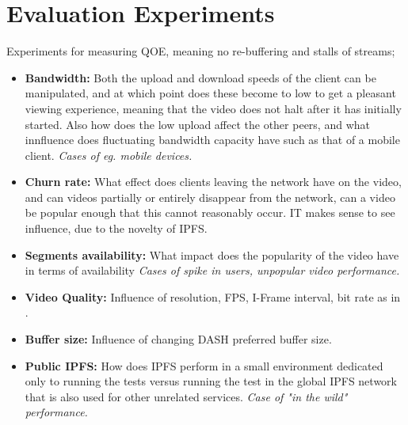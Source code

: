 \section{Evaluation Experiments}
Experiments for measuring \ac{QOE}, meaning no re-buffering and stalls of streams;
\begin{itemize}
    \item \textbf{Bandwidth:}
    Both the upload and download speeds of the client can be manipulated, and at which point does these become to low to get a pleasant viewing experience, meaning that the video does not halt after it has initially started. Also how does the low upload affect the other peers, and what innfluence does fluctuating bandwidth capacity have such as that of a mobile client.
    \textit{Cases of eg. mobile devices.}
    \item \textbf{Churn rate:}
    What effect does clients leaving the network have on the video, and can videos partially or entirely disappear from the network, can a video be popular enough that this cannot reasonably occur. IT makes sense to see influence, due to the novelty of IPFS.
    \item \textbf{Segments availability:}
    What impact does the popularity of the video have in terms of availability
    \textit{Cases of spike in users, unpopular video performance. }
    \item \textbf{Video Quality:}
    Influence of resolution, \acs{FPS}, I-Frame interval, bit rate as in \cite{aloman2015performance}.
    \item \textbf{Buffer size:}
    Influence of changing DASH preferred buffer size. %
    \item \textbf{Public IPFS:}
    How does IPFS perform in a small environment dedicated only to running the tests versus running the test in the global IPFS network that is also used for other unrelated services.
    \textit{Case of "in the wild" performance.} 
\end{itemize}
